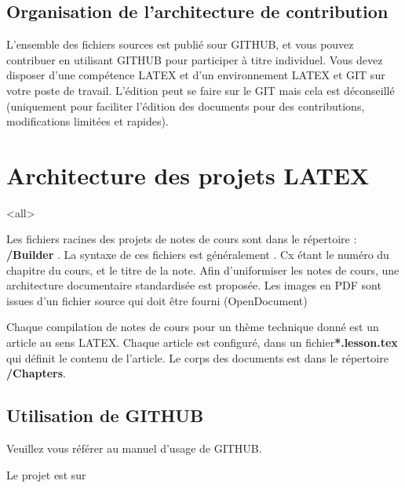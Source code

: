 \subsection{Organisation de l'architecture de contribution}

L'ensemble des fichiers sources est publié sour GITHUB, et vous pouvez contribuer en utilisant GITHUB pour participer à titre individuel. Vous devez disposer d'une compétence LATEX et d'un environnement LATEX et GIT sur votre poste de travail. L'édition peut se faire sur le GIT mais cela est déconseillé (uniquement pour faciliter l'édition des documents pour des contributions, modifications limitées et rapides).  

\section{Architecture des projets LATEX}

\mode<all>{
{
Les fichiers racines des projets de notes de cours sont dans le répertoire : \textbf{/Builder} . 
La syntaxe de ces fichiers est généralement . 
Cx étant le numéro du chapitre du cours, et  le titre de la note.
Afin d'uniformiser les notes de cours, une architecture documentaire standardisée est proposée. 
Les images en PDF sont issues d'un fichier source qui doit être fourni (OpenDocument)

Chaque compilation de notes de cours pour un thème  technique donné est un article au sens LATEX. Chaque article est configuré, dans un fichier\textbf{*.lesson.tex} qui définit le contenu de l'article. Le corps des documents est dans le répertoire \textbf{/Chapters}. 
}} %

\subsection{Utilisation de GITHUB}

Veuillez vous référer au manuel d'usage de GITHUB. 

Le projet est sur  


